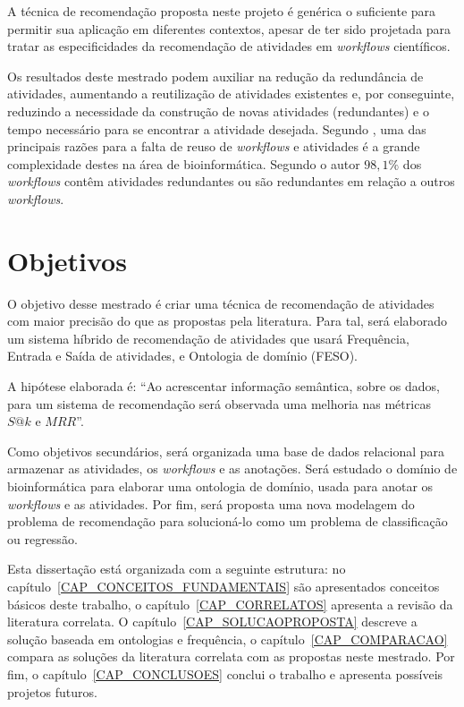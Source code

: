 A técnica de recomendação proposta neste projeto é genérica o suficiente para permitir sua aplicação em diferentes contextos, apesar de ter sido projetada para tratar as especificidades da recomendação de atividades em \emph{workflows} científicos.

Os resultados deste mestrado podem auxiliar na redução da redundância de atividades, aumentando a reutilização de atividades existentes e, por conseguinte, reduzindo a necessidade da construção de novas atividades (redundantes) e o tempo necessário para se encontrar a atividade desejada. Segundo , uma das principais razões para a falta de reuso de \emph{workflows} e atividades é a grande complexidade destes na área de bioinformática. Segundo o autor \(98,1\%\) dos \emph{workflows} contêm atividades redundantes ou são redundantes em relação a outros \emph{workflows}.

\section{Objetivos} \label{SEC_OBJETIVOS}
O objetivo desse mestrado é criar uma técnica de recomendação de atividades com maior precisão do que as propostas pela literatura. Para tal, será elaborado um sistema híbrido de recomendação de atividades que usará Frequência, Entrada e Saída de atividades, e Ontologia de domínio (FESO).

A hipótese elaborada é: ``Ao acrescentar informação semântica, sobre os dados, para um sistema de recomendação será observada uma melhoria nas métricas \(S@k\) e \(MRR\)''.

Como objetivos secundários, será organizada uma base de dados relacional para armazenar as atividades, os \emph{workflows} e as anotações. Será estudado o domínio de bioinformática para elaborar uma ontologia de domínio, usada para anotar os \emph{workflows} e as atividades. Por fim, será proposta uma nova modelagem do problema de recomendação para solucioná-lo como um problema de classificação ou regressão.

Esta dissertação está organizada com a seguinte estrutura: no capítulo~\ref{CAP_CONCEITOS_FUNDAMENTAIS} são apresentados conceitos básicos deste trabalho, o capítulo~\ref{CAP_CORRELATOS} apresenta a revisão da literatura correlata. O capítulo~\ref{CAP_SOLUCAOPROPOSTA} descreve a solução baseada em ontologias e frequência, o capítulo~\ref{CAP_COMPARACAO} compara as soluções da literatura correlata com as propostas neste mestrado. Por fim, o capítulo~\ref{CAP_CONCLUSOES} conclui o trabalho e apresenta possíveis projetos futuros.